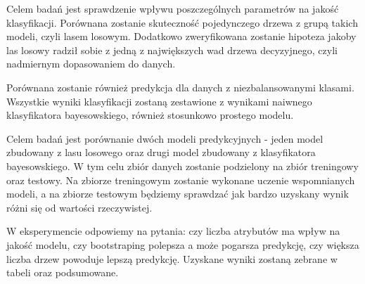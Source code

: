 Celem badań jest sprawdzenie wpływu poszczególnych parametrów na  jakość klasyfikacji. Porównana zostanie skuteczność pojedynczego drzewa z grupą takich modeli, czyli lasem losowym. Dodatkowo zweryfikowana zostanie hipoteza jakoby las losowy radził sobie z jedną z największych wad drzewa decyzyjnego, czyli nadmiernym dopasowaniem do danych.

Porównana zostanie również predykcja dla danych z niezbalansowanymi klasami. Wszystkie wyniki klasyfikacji zostaną zestawione z wynikami naiwnego klasyfikatora bayesowskiego, również stosunkowo prostego modelu.

Celem badań jest porównanie dwóch modeli predykcyjnych - jeden model zbudowany z lasu losowego oraz drugi model zbudowany z klasyfikatora bayesowskiego. W tym celu zbiór danych zostanie podzielony na zbiór treningowy oraz testowy. Na zbiorze treningowym zostanie wykonane uczenie wspomnianych modeli, a na zbiorze testowym będziemy sprawdzać jak bardzo uzyskany wynik różni się od wartości rzeczywistej.

W eksperymencie odpowiemy na pytania: czy liczba atrybutów ma wpływ na jakość modelu, czy bootstraping polepsza a może pogarsza predykcję, czy większa liczba drzew powoduje lepszą predykcję. Uzyskane wyniki zostaną zebrane w tabeli oraz podsumowane.